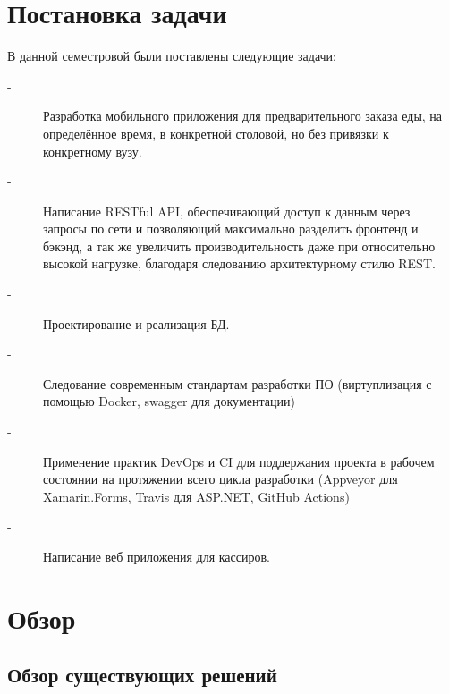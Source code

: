 \documentclass[14pt]{matmex-diploma-custom}
\begin{document}
\section{Постановка задачи}
    В данной семестровой были поставлены следующие задачи:
    \begin{description}
        \item[-] Разработка мобильного приложения для предварительного заказа еды, на определённое время, в конкретной столовой, но без привязки к конкретному вузу.
        \item[-] Написание RESTful API, обеспечивающий доступ к данным через запросы по сети и позволяющий максимально разделить фронтенд и бэкэнд, а так же увеличить производительность даже при относительно высокой нагрузке, благодаря следованию архитектурному стилю REST\cite{rest_xamarin}.
        \item[-] Проектирование и реализация БД.
        \item[-] Следование современным стандартам разработки ПО (виртуплизация с помощью Docker, swagger для документации) 
        \item[-] Применение практик DevOps и CI для поддержания проекта в рабочем состоянии на протяжении всего цикла разработки (Appveyor для Xamarin.Forms, Travis для ASP.NET, GitHub Actions)  
        \item[-] Написание веб приложения для кассиров. 
    \end{description}

\section{Обзор}
\subsection{Обзор существующих решений}
\end{document}
